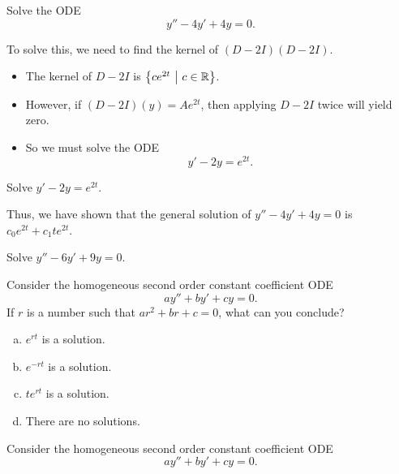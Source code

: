 
\begin{applicationActivities}

\begin{activity}{10}
Solve the ODE \[ y''-4y'+4y=0.\]
\end{activity}

\begin{observation}
To solve this, we need to find the kernel of \( (D-2I)(D-2I) \).
\begin{itemize}
\item The kernel of \(D-2I\) is \(\left\{ ce^{2t}\ \middle|\ c \in \mathbb{R} \right\}\).
\item However, if \( (D-2I)(y) = Ae^{2t} \), then applying \(D-2I\) twice will yield zero.
\item So we must solve the ODE \[y'-2y=e^{2t}.\]
\end{itemize}
\end{observation}

\begin{activity}{15}
Solve \(y'-2y=e^{2t}\).
\end{activity}


\begin{observation}
Thus, we have shown that the general solution of \(y''-4y'+4y=0\) is \(c_0e^{2t}+c_1te^{2t}\).
\end{observation}

\begin{activity}{15}
Solve \(y''-6y'+9y=0\).
\end{activity}

\begin{activity}{10}
Consider the homogeneous second order constant coefficient ODE \[ay''+by'+cy=0.\]
If \(r\) is a number such that \(ar^2+br+c=0\), what can you conclude?
\begin{enumerate}[(a)]
\item \(e^{rt}\) is a solution.
\item \(e^{-rt}\) is a solution.
\item \(te^{rt}\) is a solution.
\item There are no solutions.
\end{enumerate}
\end{activity}

\begin{activity}{5}
Consider the homogeneous second order constant coefficient ODE \[ay''+by'+cy=0.\]


\end{activity}
\end{applicationActivities}
